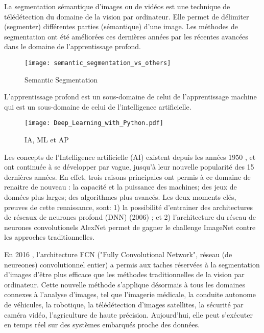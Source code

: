 ﻿\par La segmentation sémantique d'images ou de vidéos est une technique de télédétection du domaine de la vision par ordinateur. Elle permet de délimiter (segmenter) différentes parties (sémantique) d'une image. Les méthodes de segmentation ont été améliorées ces dernières années par les récentes avancées dans le domaine de l'apprentissage profond. 
\begin{figure}[H]
   \centering
   \texttt{[image: semantic\_segmentation\_vs\_others]}
   \caption{Semantic Segmentation \cite[p.~1]{wu_recent_2019}}
   \label{fig:semantic_segmentation_vs_others}
\end{figure}
\par L’apprentissage profond est un sous-domaine de celui de l'apprentissage machine qui est un sous-domaine de celui de l'intelligence artificielle. 
\begin{figure}[H]
   \centering
   \texttt{[image: Deep\_Learning\_with\_Python.pdf]}
   \caption{IA, ML et AP \cite[p.~4]{chollet_deep_2018}}
   \label{fig:ia_ml_ap}
\end{figure}
\par Les concepts de l'Intelligence artificielle (AI) existent depuis les années 1950 \cite[p.~4]{chollet_deep_2018} \cite[p.~1]{alom_history_nodate}, et ont continuée à se développer par vague, jusqu'à leur nouvelle popularité des 15 dernières années. En effet, trois raisons principales ont permis à ce domaine de renaitre de nouveau \cite[p.~20]{chollet_deep_2018}: la capacité et la puissance des machines; des jeux de données plus larges; des algorithmes plus avancés. Les deux moments clés, preuves de cette renaissance, sont: 1) la possibilité d'entrainer des architectures de réseaux de neurones profond (DNN) (2006) \cite[p.~6]{alom_history_nodate}; et 2) l'architecture du réseau de neurones convolutionels AlexNet permet de  gagner le challenge ImageNet contre les approches traditionnelles\cite[p.~11]{alom_history_nodate}. 
\par En 2016 \cite[p.~14]{alom_history_nodate}, l'architecture FCN ("Fully Convolutional Network", réseau (de neureones) convolutionnel entier) a permis aux taches réservées à la segmentation d'images d'être plus efficace que les méthodes traditionnelles de la vision par ordinateur. Cette nouvelle méthode s'applique désormais à tous les domaines connexes à l'analyse d'images, tel que l'imagerie médicale, la conduite autonome de véhicules, la robotique, la télédétection d'images satellites, la sécurité par caméra vidéo, l'agriculture de haute précision. Aujourd'hui, elle peut s'exécuter en temps réel sur des systèmes embarqués proche des données. 